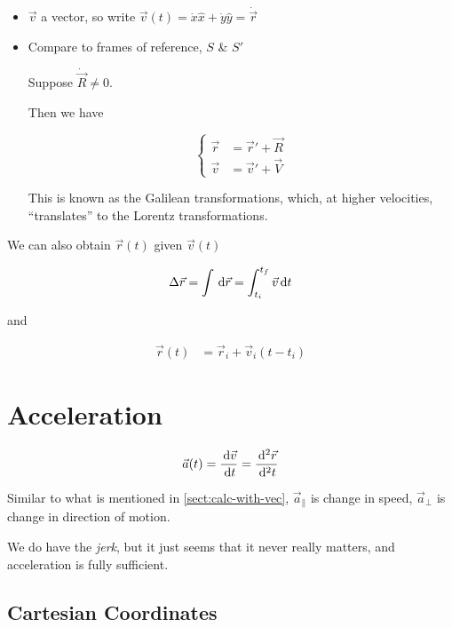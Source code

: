 \begin{itemize}
	\item $\vec v$ a vector, so write $\vec v(t) = \dot x \hat x + \dot y \hat y = \dot{\vec{r}}$
	\item Compare to frames of reference, $S$ \& $S'$
	
	Suppose $\dot{\vec{R}} \neq 0$.

	Then we have

	\begin{equation}
		\begin{cases}
			\vec r &= \vec r' + \vec R\\
			\vec v &= \vec v' + \vec V
		\end{cases}
	\end{equation}

	This is known as the Galilean transformations, which, at higher velocities, ``translates'' to the Lorentz transformations.
\end{itemize}

We can also obtain $\vec r(t)$ given $\vec v(t)$

\begin{equation}
	\Delta \vec r = \int \D \vec r = \int_{t_i}^{t_f} \vec v \D t
\end{equation}

and

\begin{align}
	\vec r(t) &= \vec r_i + \vec v_i (t - t_i)
\end{align}

\section{Acceleration}

\begin{definition}
	\begin{equation}
		\vec a(t) = \frac{\D \vec v}{\D t} = \frac{\D^2 \vec r}{\D^2 t}
	\end{equation}
\end{definition}

Similar to what is mentioned in \cref*{sect:calc-with-vec}, $\vec a_\parallel$ is change in speed, $\vec a_\perp$ is change in direction of motion.

\begin{remark}
	We do have the \textit{jerk}, but it just seems that it never really matters, and acceleration is fully sufficient.
\end{remark}

\subsection{Cartesian Coordinates}

